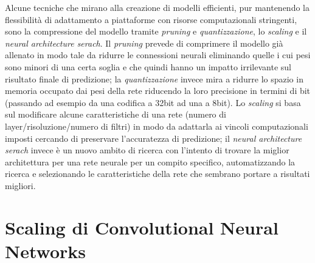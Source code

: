 Alcune tecniche che mirano alla creazione di modelli efficienti, pur mantenendo la flessibilità di adattamento a piattaforme con risorse computazionali stringenti, sono la compressione del modello tramite \textit{pruning} e \textit{quantizzazione}, lo \textit{scaling} e il \textit{neural architecture serach}. Il \textit{pruning} prevede di comprimere il modello già allenato in modo tale da ridurre le connessioni neurali eliminando quelle i cui pesi sono minori di una certa soglia e che quindi hanno un impatto irrilevante sul risultato finale di predizione; la \textit{quantizzazione} invece mira a ridurre lo spazio in memoria occupato dai pesi della rete riducendo la loro precisione in termini di bit (passando ad esempio da una codifica a 32bit ad una a 8bit). Lo \textit{scaling} si basa sul modificare alcune caratteristiche di una rete (numero di layer/risoluzione/numero di filtri) in modo da adattarla ai vincoli computazionali imposti cercando di preservare l'accuratezza di predizione; il \textit{neural architecture serach} invece è un nuovo ambito di ricerca con l'intento di trovare la miglior architettura per una rete neurale per un compito specifico, automatizzando la ricerca e selezionando le caratteristiche della rete che sembrano portare a risultati migliori. 


\newpage
\section{Scaling di Convolutional Neural Networks}
\label{sec:obiettivo}


